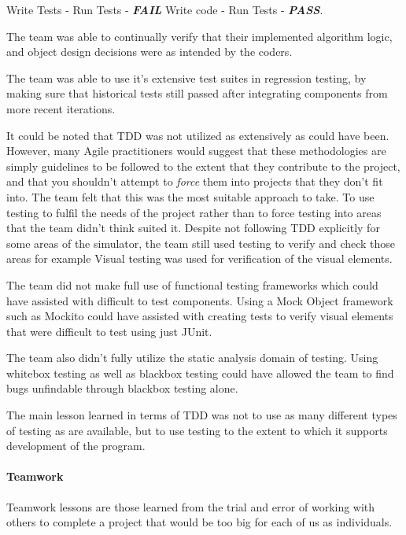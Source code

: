 \documentclass[11pt]{article}
\begin{document}
{\begin{enumerate}
	Write Tests - Run Tests - \textbf {\textit{FAIL}} \rightarrow Write code - Run Tests - \textbf {\textit{PASS}}. 
	
	The team was able to continually verify that their implemented algorithm logic, and object design decisions were as intended by the coders.
	
	The team was able to use it's extensive test suites in regression testing, by making sure that historical tests still passed after integrating components from more recent iterations.
	
	It could be noted that TDD was not utilized as extensively as could have been. However, many Agile practitioners would suggest that these methodologies are simply guidelines to be followed to the extent that they contribute to the project, and that you shouldn't attempt to \textit{force} them into projects that they don't fit into. The team felt that this was the most suitable approach to take. To use testing to fulfil the needs of the project rather than to force testing into areas that the team didn't think suited it. Despite not following TDD explicitly for some areas of the simulator, the team still used testing to verify and check those areas for example Visual testing was used for verification of the visual elements.
	
	The team did not make full use of functional testing frameworks which could have assisted with difficult to test components. Using a Mock Object framework such as Mockito could have assisted with creating tests to verify visual elements that were difficult to test using just JUnit.
	
	The team also didn't fully utilize the static analysis domain of testing. Using whitebox testing as well as blackbox testing could have allowed the team to find bugs unfindable through blackbox testing alone.
	
	The main lesson learned in terms of TDD was not to use as many different types of testing as are available, but to use testing to the extent to which it supports development of the program.
	
	
\end{enumerate}
\paragraph{Teamwork}

Teamwork lessons are those learned from the trial and error of working with others to complete a project that would be too big for each of us as individuals.

}
\end{document}
